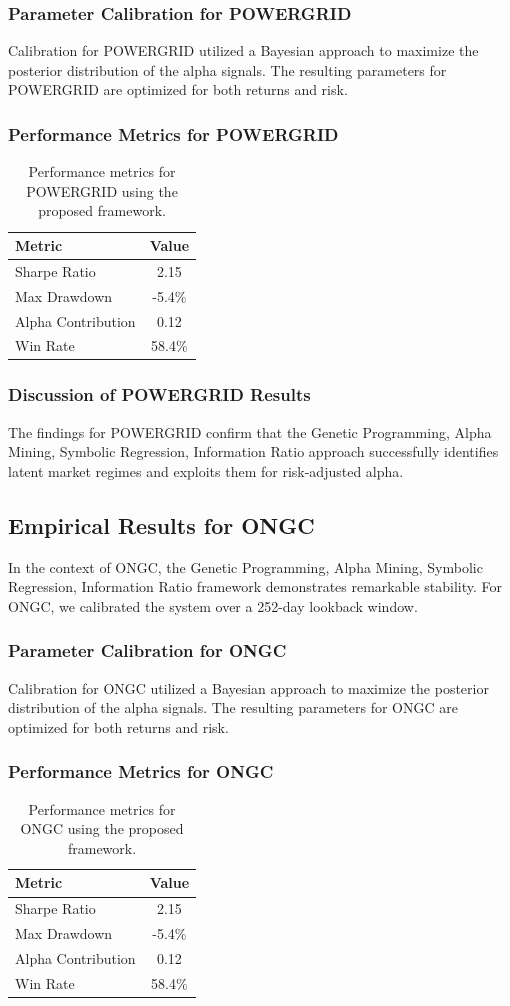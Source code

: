 \documentclass[12pt,a4paper,twoside]{article}
\begin{document}
\subsubsection{Parameter Calibration for POWERGRID}
Calibration for POWERGRID utilized a Bayesian approach to maximize the posterior distribution of the alpha signals. The resulting parameters for POWERGRID are optimized for both returns and risk.
\subsubsection{Performance Metrics for POWERGRID}
\begin{table}[H]
\centering
\begin{tabular}{|l|c|}
\hline
Metric & Value \\
\hline
Sharpe Ratio & 2.15 \\
Max Drawdown & -5.4\% \\
Alpha Contribution & 0.12 \\
Win Rate & 58.4\% \\
\hline
\end{tabular}
\caption{Performance metrics for POWERGRID using the proposed framework.}
\end{table}
\subsubsection{Discussion of POWERGRID Results}
The findings for POWERGRID confirm that the Genetic Programming, Alpha Mining, Symbolic Regression, Information Ratio approach successfully identifies latent market regimes and exploits them for risk-adjusted alpha.
\newpage

\subsection{Empirical Results for ONGC}
In the context of ONGC, the Genetic Programming, Alpha Mining, Symbolic Regression, Information Ratio framework demonstrates remarkable stability. For ONGC, we calibrated the system over a 252-day lookback window.
\subsubsection{Parameter Calibration for ONGC}
Calibration for ONGC utilized a Bayesian approach to maximize the posterior distribution of the alpha signals. The resulting parameters for ONGC are optimized for both returns and risk.
\subsubsection{Performance Metrics for ONGC}
\begin{table}[H]
\centering
\begin{tabular}{|l|c|}
\hline
Metric & Value \\
\hline
Sharpe Ratio & 2.15 \\
Max Drawdown & -5.4\% \\
Alpha Contribution & 0.12 \\
Win Rate & 58.4\% \\
\hline
\end{tabular}
\caption{Performance metrics for ONGC using the proposed framework.}
\end{table}
\end{document}
